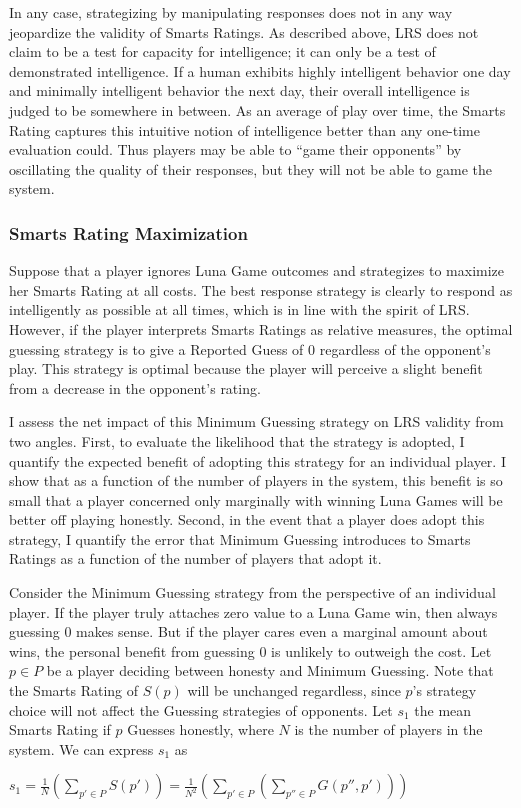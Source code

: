 In any case, strategizing by manipulating responses does not in any way jeopardize the validity of Smarts Ratings. As described above, LRS does not claim to be a test for capacity for intelligence; it can only be a test of demonstrated intelligence. If a human exhibits highly intelligent behavior one day and minimally intelligent behavior the next day, their overall intelligence is judged to be somewhere in between. As an average of play over time, the Smarts Rating captures this intuitive notion of intelligence better than any one-time evaluation could. Thus players may be able to ``game their opponents'' by oscillating the quality of their responses, but they will not be able to game the system.

\subsubsection{Smarts Rating Maximization}

Suppose that a player ignores Luna Game outcomes and strategizes to maximize her Smarts Rating at all costs. The best response strategy is clearly to respond as intelligently as possible at all times, which is in line with the spirit of LRS. However, if the player interprets Smarts Ratings as relative measures, the optimal guessing strategy is to give a Reported Guess of $0$ regardless of the opponent's play. This strategy is optimal because the player will perceive a slight benefit from a decrease in the opponent's rating. 

I assess the net impact of this Minimum Guessing strategy on LRS validity from two angles. First, to evaluate the likelihood that the strategy is adopted, I quantify the expected benefit of adopting this strategy for an individual player. I show that as a function of the number of players in the system, this benefit is so small that a player concerned only marginally with winning Luna Games will be better off playing honestly. Second, in the event that a player does adopt this strategy, I quantify the error that Minimum Guessing introduces to Smarts Ratings as a function of the number of players that adopt it.

Consider the Minimum Guessing strategy from the perspective of an individual player. If the player truly attaches zero value to a Luna Game win, then always guessing $0$ makes sense. But if the player cares even a marginal amount about wins, the personal benefit from guessing $0$ is unlikely to outweigh the cost. Let $p \in P$ be a player deciding between honesty and Minimum Guessing. Note that the Smarts Rating of $S(p)$ will be unchanged regardless, since $p$'s strategy choice will not affect the Guessing strategies of opponents. Let $s_1$ the mean Smarts Rating if $p$ Guesses honestly, where $N$ is the number of players in the system. We can express $s_1$ as
\begin{center}
\begin{math}
s_1 = \frac{1}{N}(\sum_{p' \in P}S(p')) = \frac{1}{N^2}(\sum_{p' \in P}(\sum_{p'' \in P}G(p'', p')))
\end{math}
\end{center}

